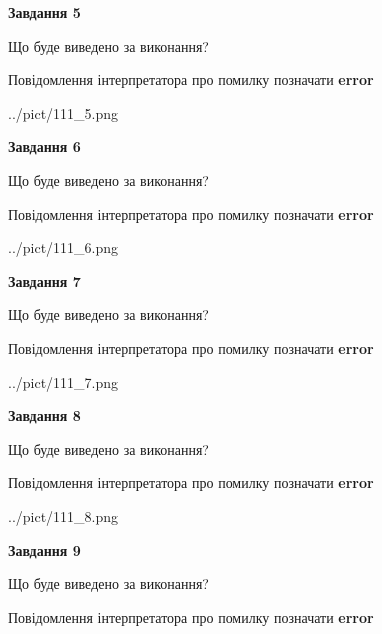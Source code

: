 \documentclass[11pt, ukrainian]{article}
\begin{document}
{\begin {large}
{\begin {center}\textbf{Завдання 5}\end {center}}\par
Що буде виведено за виконання? \par
Повідомлення інтерпретатора про помилку позначати \textbf{error}

\begin{center}
	{../pict/111_5.png}
\end{center}
\newpage

{\begin {center}\textbf{Завдання 6}\end {center}}\par
Що буде виведено за виконання? \par
Повідомлення інтерпретатора про помилку позначати \textbf{error}

\begin{center}
	{../pict/111_6.png}
\end{center}
\newpage

{\begin {center}\textbf{Завдання 7}\end {center}}\par
Що буде виведено за виконання? \par
Повідомлення інтерпретатора про помилку позначати \textbf{error}

\begin{center}
	{../pict/111_7.png}
\end{center}
\newpage

{\begin {center}\textbf{Завдання 8}\end {center}}\par
Що буде виведено за виконання? \par
Повідомлення інтерпретатора про помилку позначати \textbf{error}

\begin{center}
	{../pict/111_8.png}
\end{center}
\newpage

{\begin {center}\textbf{Завдання 9}\end {center}}\par
Що буде виведено за виконання? \par
Повідомлення інтерпретатора про помилку позначати \textbf{error}


\end{large}}
\end{document}
